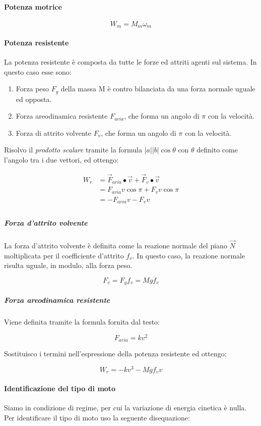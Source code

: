 \documentclass[main.tex]{subfiles}
\begin{document}
\paragraph{Potenza motrice}

\[
  W_m = M_m\omega_m
\]

\paragraph{Potenza resistente} La potenza resistente è composta da tutte le forze ed attriti agenti sul sistema. In questo caso esse sono:

\begin{enumerate}
\item Forza peso $F_g$ della massa M è contro bilanciata da una forza normale uguale ed opposta.
\item Forza areodinamica resistente $F_{aria}$, che forma un angolo di $\pi$ con la velocità.
\item Forza di attrito volvente $F_v$, che forma un angolo di $\pi$ con la velocità.
\end{enumerate}



Risolvo il \textit{prodotto scalare} tramite la formula $|a||b|\cos\theta$ con $\theta$ definito come l'angolo tra i due vettori, ed ottengo:

\begin{align*}
  W_r &= \vec{F}_{aria}\bullet\vec{v} + \vec{F}_v\bullet\vec{v}\\
    &= F_{aria}v\cos\pi + F_vv\cos\pi\\
    &= - F_{aria}v  - F_vv\\
\end{align*}

\subparagraph{Forza d'attrito volvente} La forza d'attrito volvente è definita come la reazione normale del piano $\vec{N}$ moltiplicata per il coefficiente d'attrito $f_v$. In questo caso, la reazione normale risulta uguale, in modulo, alla forza peso.

\[
  F_v = F_gf_v = Mgf_v
\]

\subparagraph{Forza areodinamica resistente} Viene definita tramite la formula fornita dal testo:

\[
  F_{aria} = kv^2
\]

Sostituisco i termini nell'espressione della potenza resistente ed ottengo:

\[
  W_r = -kv^3 - Mgf_vv
\]

\paragraph{Identificazione del tipo di moto}
Siamo in condizione di regime, per cui la variazione di energia cinetica è nulla. Per identificare il tipo di moto uso la seguente disequazione:
\end{document}

